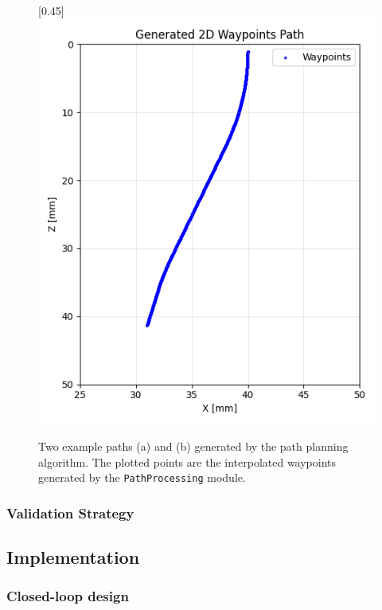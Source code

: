 \begin{figure}[H]
\begin{subcaptionbox}{\label{fig:right}}[0.45\linewidth]
        {\includegraphics[width=\linewidth]{images/waypoints/Figure_1.png}}
    \end{subcaptionbox}
    \caption{Two example paths (a) and (b) generated by the path planning algorithm. The plotted points are the interpolated waypoints generated by the \texttt{PathProcessing} module.}
    \label{fig:waypoints}
\end{figure}



\subsubsection{Validation Strategy}


\subsection{Implementation}


\subsubsection{Closed-loop design}


